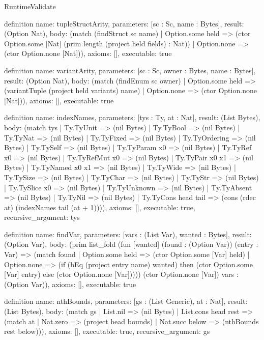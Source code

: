 \begin{lexlean}{RuntimeValidate}
\begin{semanticmodule}
definition{
  name: tupleStructArity,
  parameters: [sc : Sc, name : Bytes],
  result: (Option Nat),
  body: (match (findStruct sc name)
    | Option.some held => (ctor Option.some [Nat] (prim length (project held fields) : Nat))
    | Option.none => (ctor Option.none [Nat])),
  axioms: [],
  executable: true
}

definition{
  name: variantArity,
  parameters: [sc : Sc, owner : Bytes, name : Bytes],
  result: (Option Nat),
  body: (match (findEnum sc owner)
    | Option.some held => (variantTuple (project held variants) name)
    | Option.none => (ctor Option.none [Nat])),
  axioms: [],
  executable: true
}

definition{
  name: indexNames,
  parameters: [tys : Ty, at : Nat],
  result: (List Bytes),
  body: (match tys
    | Ty.TyUnit => (nil Bytes)
    | Ty.TyBool => (nil Bytes)
    | Ty.TyNat => (nil Bytes)
    | Ty.TyFixed => (nil Bytes)
    | Ty.TyOrdering => (nil Bytes)
    | Ty.TySelf => (nil Bytes)
    | Ty.TyParam x0 => (nil Bytes)
    | Ty.TyRef x0 => (nil Bytes)
    | Ty.TyRefMut x0 => (nil Bytes)
    | Ty.TyPair x0 x1 => (nil Bytes)
    | Ty.TyNamed x0 x1 => (nil Bytes)
    | Ty.TyWide => (nil Bytes)
    | Ty.TySize => (nil Bytes)
    | Ty.TyChar => (nil Bytes)
    | Ty.TyStr => (nil Bytes)
    | Ty.TySlice x0 => (nil Bytes)
    | Ty.TyUnknown => (nil Bytes)
    | Ty.TyAbsent => (nil Bytes)
    | Ty.TyNil => (nil Bytes)
    | Ty.TyCons head tail => (cons (rdec at) (indexNames tail (at + 1)))),
  axioms: [],
  executable: true,
  recursive_argument: tys
}

definition{
  name: findVar,
  parameters: [vars : (List Var), wanted : Bytes],
  result: (Option Var),
  body: (prim list_fold (fun [wanted] (found : (Option Var)) (entry : Var) => (match found
    | Option.some held => (ctor Option.some [Var] held)
    | Option.none => (if (bEq (project entry name) wanted) then (ctor Option.some [Var] entry) else (ctor Option.none [Var])))) (ctor Option.none [Var]) vars : (Option Var)),
  axioms: [],
  executable: true
}

definition{
  name: nthBounds,
  parameters: [gs : (List Generic), at : Nat],
  result: (List Bytes),
  body: (match gs
    | List.nil => (nil Bytes)
    | List.cons head rest => (match at
      | Nat.zero => (project head bounds)
      | Nat.succ below => (nthBounds rest below))),
  axioms: [],
  executable: true,
  recursive_argument: gs
}


\end{semanticmodule}
\end{lexlean}
